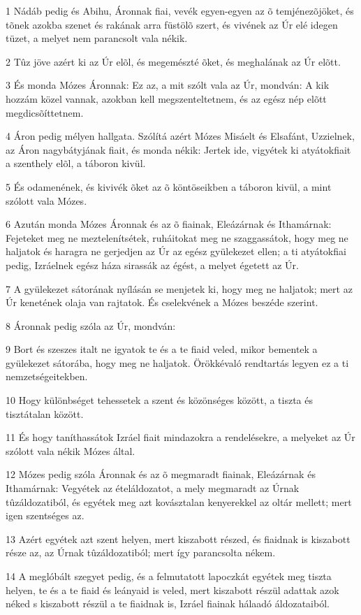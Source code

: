 \par 1 Nádáb pedig és Abihu, Áronnak fiai, vevék egyen-egyen az õ temjénezõjöket, és tõnek azokba szenet és rakának arra füstölõ szert, és vivének az Úr elé idegen tüzet, a melyet nem parancsolt vala nékik.
\par 2 Tûz jöve azért ki az Úr elõl, és megemészté õket, és meghalának az Úr elõtt.
\par 3 És monda Mózes Áronnak: Ez az, a mit szólt vala az Úr, mondván: A kik hozzám közel vannak, azokban kell megszenteltetnem, és az egész nép elõtt megdicsõíttetnem.
\par 4 Áron pedig mélyen hallgata. Szólítá azért Mózes Misáelt és Elsafánt, Uzzielnek, az Áron nagybátyjának fiait, és monda nékik: Jertek ide, vigyétek ki atyátokfiait a szenthely elõl, a táboron kivül.
\par 5 És odamenének, és kivivék õket az õ köntöseikben a táboron kivül, a mint szólott vala Mózes.
\par 6 Azután monda Mózes Áronnak és az õ fiainak, Eleázárnak és Ithamárnak: Fejeteket meg ne meztelenítsétek, ruháitokat meg ne szaggassátok, hogy meg ne haljatok és haragra ne gerjedjen az Úr az egész gyülekezet ellen; a ti atyátokfiai pedig, Izráelnek egész háza sirassák az égést, a melyet égetett az Úr.
\par 7 A gyülekezet sátorának nyílásán se menjetek ki, hogy meg ne haljatok; mert az Úr kenetének olaja van rajtatok. És cselekvének a Mózes beszéde szerint.
\par 8 Áronnak pedig szóla az Úr, mondván:
\par 9 Bort és szeszes italt ne igyatok te és a te fiaid veled, mikor bementek a gyülekezet sátorába, hogy meg ne haljatok. Örökkévaló rendtartás legyen ez a ti nemzetségeitekben.
\par 10 Hogy különbséget tehessetek a szent és közönséges között, a tiszta és tisztátalan között.
\par 11 És hogy taníthassátok Izráel fiait mindazokra a rendelésekre, a melyeket az Úr szólott vala nékik Mózes által.
\par 12 Mózes pedig szóla Áronnak és az õ megmaradt fiainak, Eleázárnak és Ithamárnak: Vegyétek az ételáldozatot, a mely megmaradt az Úrnak tûzáldozatiból, és egyétek meg azt kovásztalan kenyerekkel az oltár mellett; mert igen szentséges az.
\par 13 Azért egyétek azt szent helyen, mert kiszabott részed, és fiaidnak is kiszabott része az, az Úrnak tûzáldozatiból; mert így parancsolta nékem.
\par 14 A meglóbált szegyet pedig, és a felmutatott lapoczkát egyétek meg tiszta helyen, te és a te fiaid és leányaid is veled, mert kiszabott részül adattak azok néked s kiszabott részül a te fiaidnak is, Izráel fiainak hálaadó áldozataiból.
